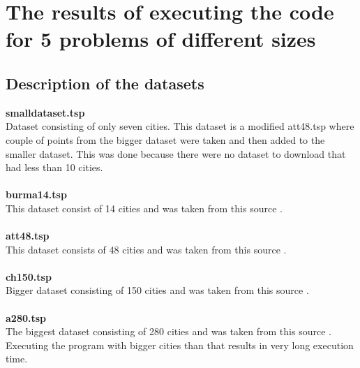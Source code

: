 \documentclass[12pt]{report}
\begin{document}
    \section{The results of executing the code for 5 problems of different sizes}

    \subsection{Description of the datasets}
    \textbf{smalldataset.tsp}\\
    Dataset consisting of only seven cities. This dataset is a modified att48.tsp where couple of points from the bigger dataset were taken and then added to the smaller dataset. This was done because there were no dataset to download that had less than 10 cities.\\
    \\
    \textbf{burma14.tsp}\\
    This dataset consist of 14 cities and was taken from this source \cite{DatasetSource}.\\
    \\
    \textbf{att48.tsp}\\
    This dataset consists of 48 cities and was taken from this source \cite{att48Data}.\\
    \\
    \textbf{ch150.tsp}\\
    Bigger dataset consisting of 150 cities and was taken from this source \cite{DatasetSource}.\\
    \\
    \textbf{a280.tsp}\\
    The biggest dataset consisting of 280 cities and was taken from this source \cite{DatasetSource}. Executing the program with bigger cities than that results in very long execution time. 
    \newpage
\end{document}
